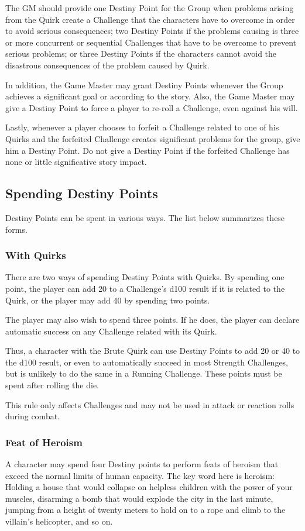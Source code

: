 \begin{multicols}{2}
The GM should provide one Destiny Point
for the Group when problems arising from the
Quirk create a Challenge that the characters have
to overcome in order to avoid serious
consequences; two Destiny Points if the problems
causing is three or more concurrent or sequential
Challenges that have to be overcome to prevent
serious problems; or three Destiny Points if the
characters cannot avoid the disastrous
consequences of the problem caused by Quirk.

In addition, the Game Master may grant
Destiny Points whenever the Group achieves a
significant goal or according to the story. Also, the
Game Master may give a Destiny Point to force a
player to re-roll a Challenge, even against his will.

Lastly, whenever a player chooses to forfeit
a Challenge related to one of his Quirks and the
forfeited Challenge creates significant problems
for the group, give him a Destiny Point. Do not give
a Destiny Point if the forfeited Challenge has none
or little significative story impact.
\subsection{Spending Destiny Points}
Destiny Points can be spent in various
ways. The list below summarizes these forms.

\subsubsection{With Quirks}
There are two ways of spending Destiny
Points with Quirks. By spending one point, the
player can add 20 to a Challenge's d100 result if it
is related to the Quirk, or the player may add 40 by
spending two points.

The player may also wish to spend three
points. If he does, the player can declare automatic
success on any Challenge related with its Quirk.

Thus, a character with the Brute Quirk can
use Destiny Points to add 20 or 40 to the d100
result, or even to automatically succeed in most
Strength Challenges, but is unlikely to do the same
in a Running Challenge. These points must be
spent after rolling the die.

This rule only affects Challenges and may
not be used in attack or reaction rolls during
combat.

\subsubsection{Feat of Heroism}
A character may spend four Destiny points
to perform feats of heroism that exceed the normal
limits of human capacity. The key word here is
heroism: Holding a house that would collapse on
helpless children with the power of your muscles,
disarming a bomb that would explode the city in
the last minute, jumping from a height of twenty
meters to hold on to a rope and climb to the
villain’s helicopter, and so on.


\end{multicols}
